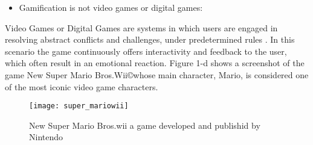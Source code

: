 \begin{itemize}
\item Gamification is not video games or digital games:
\end{itemize}

Video Games or Digital Games are systems in which users are
engaged in resolving abstract conflicts and challenges, under
predetermined rules \cite{fullerton2008}. In this scenario the game continuously
offers interactivity and feedback to the user, which often result in
an emotional reaction. Figure 1-d shows a screenshot of the game
New Super Mario Bros.Wii\copyright whose main character, Mario, is
considered one of the most iconic video game characters.

\begin{figure}[h!]
\caption{New Super Mario Bros.wii a game developed and publishid by Nintendo}
\centering
\texttt{[image: super\_mariowii]}
\label{fig:super_mariowii}
\end{figure}

